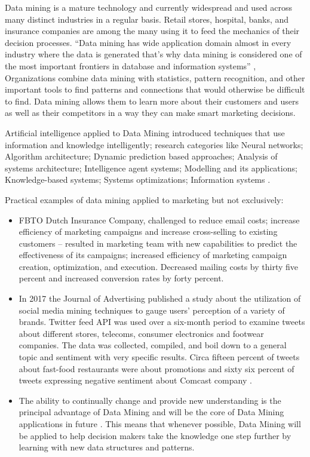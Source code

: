 \documentclass[runningheads]{llncs}
\begin{document}
Data mining is a mature technology and currently widespread and used across many distinct industries in a regular basis. Retail stores, hospital, banks, and insurance companies are among the many using it to feed the mechanics of their decision processes. “Data mining has wide application domain almost in every industry where the data is generated that’s why data mining is considered one of the most important frontiers in database and information systems” \cite{Bharati}, Organizations combine data mining with statistics, pattern recognition, and other important tools to find patterns and connections that would otherwise be difficult to find. Data mining allows them to learn more about their customers and users as well as their competitors in a way they can make smart marketing decisions.

Artificial intelligence applied to Data Mining introduced techniques that use information and knowledge intelligently; research categories like Neural networks; Algorithm architecture; Dynamic prediction based approaches; Analysis of systems architecture; Intelligence agent systems; Modelling and its applications; Knowledge-based systems; Systems optimizations; Information systems \cite{liao}.

Practical examples of data mining applied to marketing but not exclusively:

\begin{itemize}
	\item FBTO Dutch Insurance Company, challenged to reduce email costs; increase efficiency of marketing campaigns and increase cross-selling to existing customers – resulted in marketing team with new capabilities to predict the effectiveness of its campaigns; increased efficiency of marketing campaign creation, optimization, and execution. Decreased mailing costs by thirty five percent and increased conversion rates by forty percent.
	\item In 2017 the Journal of Advertising published a study about the utilization of social media mining techniques to gauge users’ perception of a variety of brands. Twitter feed API was used over a six-month period to examine tweets about different stores, telecoms, consumer electronics and footwear companies. The data was collected, compiled, and boil down to a general topic and sentiment with very specific results. Circa fifteen percent of tweets about fast-food restaurants were about promotions and sixty six percent of tweets expressing negative sentiment about Comcast company \cite{McCourt_2018}.
	\item The ability to continually change and provide new understanding is the principal advantage of Data Mining and will be the core of Data Mining applications in future \cite{liao}. This means that whenever possible, Data Mining will be applied to help decision makers take the knowledge one step further by learning with new data structures and patterns.
\end{itemize}
\end{document}
